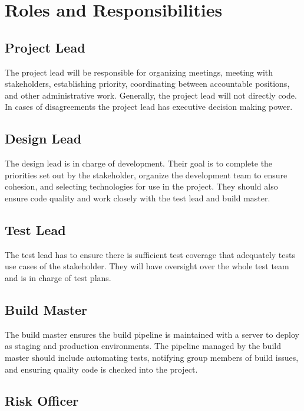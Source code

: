 \documentclass{scrreprt}
\begin{document}
\section{Roles and Responsibilities}

\subsection{Project Lead}

The project lead will be responsible for organizing meetings,
meeting with stakeholders, establishing priority, coordinating
between accountable positions, and other administrative work. 
Generally, the project lead will not directly code.
In cases of disagreements the project lead has executive decision making power.

\subsection{Design Lead}

The design lead is in charge of development. Their goal is
to complete the priorities set out by the stakeholder, organize
the development team to ensure cohesion, and selecting technologies
for use in the project. They should also ensure code quality and
work closely with the test lead and build master.

\subsection{Test Lead}

The test lead has to ensure there is sufficient test coverage
that adequately tests use cases of the stakeholder. They will
have oversight over the whole test team and is in charge of 
test plans.

\subsection{Build Master}

The build master ensures the build pipeline is maintained with
a server to deploy as staging and production environments. The
pipeline managed by the build master should include automating
tests, notifying group members of build issues, and ensuring
quality code is checked into the project.

\subsection{Risk Officer}
\end{document}
